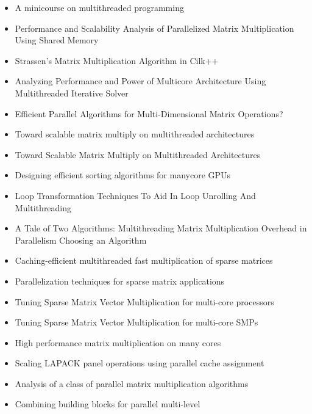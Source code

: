 \begin{itemize}
\item[\textbullet] A minicourse on multithreaded programming
  \cite{Leiserson1998}
\item[\textbullet] Performance and Scalability Analysis of
  Parallelized Matrix Multiplication Using Shared Memory
  \cite{Dinkins2007}
\item[\textbullet] Strassen's Matrix Multiplication Algorithm in
  Cilk++ \cite{Kuszmaul2009}
\item[\textbullet] Analyzing Performance and Power of Multicore
  Architecture Using Multithreaded Iterative Solver \cite{Lee2010}
\item[\textbullet] Efficient Parallel Algorithms for Multi-Dimensional
  Matrix Operations? \cite{Liu2000}
\item[\textbullet] Toward scalable matrix multiply on multithreaded
  architectures \cite{Marker2007}
\item[\textbullet] Toward Scalable Matrix Multiply on Multithreaded
  Architectures \cite{Marker2007a}
\item[\textbullet] Designing efficient sorting algorithms for manycore
  GPUs \cite{Satish2009}
\item[\textbullet] Loop Transformation Techniques To Aid In Loop
  Unrolling And Multithreading \cite{Song2003}
\item[\textbullet] A Tale of Two Algorithms: Multithreading Matrix
  Multiplication Overhead in Parallelism Choosing an Algorithm
  \cite{Steele2010}
\item[\textbullet] Caching-efficient multithreaded fast multiplication
  of sparse matrices \cite{Sulatycke1998}
\item[\textbullet] Parallelization techniques for sparse matrix
  applications \cite{Ujaldon1996}
\item[\textbullet] Tuning Sparse Matrix Vector Multiplication for
  multi-core processors \cite{Williams2007}
\item[\textbullet] Tuning Sparse Matrix Vector Multiplication for
  multi-core SMPs \cite{Williams2007a}
\item[\textbullet] High performance matrix multiplication on many
  cores \cite{Yuan2009}
\item[\textbullet] Scaling LAPACK panel operations using parallel
  cache assignment \cite{Castaldo2010}
\item[\textbullet] Analysis of a class of parallel matrix
  multiplication algorithms \cite{Gunnels1998}
\item[\textbullet] Combining building blocks for parallel multi-level

\end{itemize}
